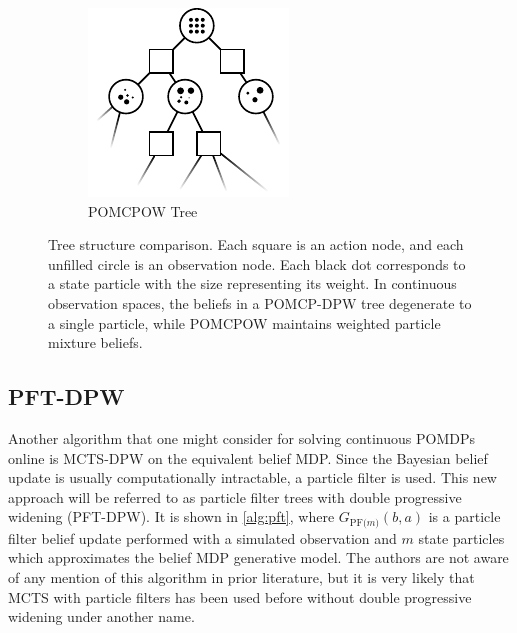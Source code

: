 \begin{figure}[htpb]
\begin{subfigure}[b]{0.45\columnwidth}
        \includegraphics[width=\textwidth]{media/pomcpow_tree.pdf}
        \caption{POMCPOW Tree}
    \end{subfigure}
    \caption[POMCP-DPW and POMCPOW tree structure comparison]{Tree structure comparison. Each square is an action node, and each unfilled circle is an observation node. Each black dot corresponds to a state particle with the size representing its weight. In continuous observation spaces, the beliefs in a POMCP-DPW tree degenerate to a single particle, while POMCPOW maintains weighted particle mixture beliefs.}
    \label{fig:treecomp}
\end{figure}

\subsection{PFT-DPW}

Another algorithm that one might consider for solving continuous POMDPs online is MCTS-DPW on the equivalent belief MDP.
Since the Bayesian belief update is usually computationally intractable, a particle filter is used.
This new approach will be referred to as particle filter trees with double progressive widening (PFT-DPW).
It is shown in \cref{alg:pft}, where $G_\text{PF($m$)}(b,a)$ is a particle filter belief update performed with a simulated observation and $m$ state particles which approximates the belief MDP generative model.
The authors are not aware of any mention of this algorithm in prior literature, but it is very likely that MCTS with particle filters has been used before without double progressive widening under another name.

